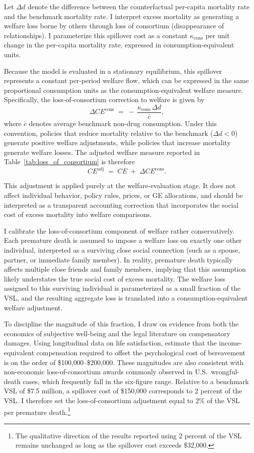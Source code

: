 \documentclass[parskip=full]{article}
\theoremstyle{plain}
\theoremstyle{definition}
\theoremstyle{remark}
\begin{document}
Let $\Delta d$ denote the difference between the counterfactual per-capita mortality rate and the benchmark mortality rate. I interpret excess mortality as generating a welfare loss borne by others through loss of consortium (disappearance of relationships). I parameterize this spillover cost as a constant $\kappa_\text{cons}$ per unit change in the per-capita mortality rate, expressed in consumption-equivalent units.

Because the model is evaluated in a stationary equilibrium, this spillover represents a constant per-period welfare flow, which can be expressed in the same proportional consumption units as the consumption-equivalent welfare measure. Specifically, the loss-of-consortium correction to welfare is given by
\[\Delta CE^{\text{cons}} \;=\; -\,\frac{\kappa_\text{cons}\,\Delta d}{\bar c},\]
where $\bar c$ denotes average benchmark non-drug consumption. Under this convention, policies that reduce mortality relative to the benchmark ($\Delta d<0$) generate positive welfare adjustments, while policies that increase mortality generate welfare losses. The adjusted welfare measure reported in Table~\ref{tab:loss_of_consortium} is therefore
\[CE^{\text{adj}} \;=\; CE \;+\; \Delta CE^{\text{cons}}.\]

This adjustment is applied purely at the welfare-evaluation stage. It does not affect individual behavior, policy rules, prices, or GE allocations, and should be interpreted as a transparent accounting correction that incorporates the social cost of excess mortality into welfare comparisons.

I calibrate the loss-of-consortium component of welfare rather conservatively. Each premature death is assumed to impose a welfare loss on exactly one other individual, interpreted as a surviving close social connection (such as a spouse, partner, or immediate family member). In reality, premature death typically affects multiple close friends and family members, implying that this assumption likely understates the true social cost of excess mortality. The welfare loss assigned to this surviving individual is parameterized as a small fraction of the VSL, and the resulting aggregate loss is translated into a consumption-equivalent welfare adjustment. 

To discipline the magnitude of this fraction, I draw on evidence from both the economics of subjective well-being and the legal literature on compensatory damages. Using longitudinal data on life satisfaction, \citet{oswald2007death} estimate that the income-equivalent compensation required to offset the psychological cost of bereavement is on the order of \$100{,}000–\$200{,}000. These magnitudes are also consistent with non-economic loss-of-consortium awards commonly observed in U.S.\ wrongful-death cases, which frequently fall in the six-figure range. Relative to a benchmark VSL of \$7.5 million, a spillover cost of \$150{,}000 corresponds to 2 percent of the VSL. I therefore set the loss-of-consortium adjustment equal to 2\% of the VSL per premature death.\footnote{The qualitative direction of the results reported using 2 percent of the VSL remains unchanged as long as the spillover cost exceeds \$32{,}000.}
\end{document}

